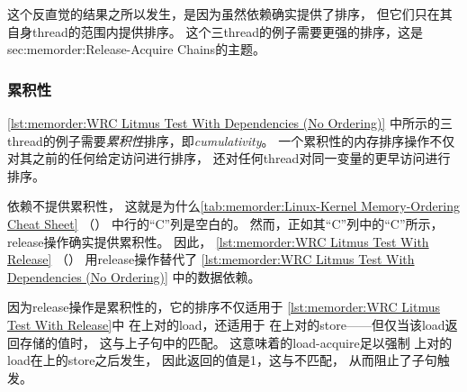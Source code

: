 \QuickQuizEnd

这个反直觉的结果之所以发生，是因为虽然依赖确实提供了排序，
但它们只在其自身thread的范围内提供排序。
这个三thread的例子需要更强的排序，这是
{sec:memorder:Release-Acquire Chains}的主题。

\subsubsection{累积性}
\label{sec:memorder:Cumulativity}

\cref{lst:memorder:WRC Litmus Test With Dependencies (No Ordering)}
中所示的三thread的例子需要\emph{累积性}排序，即\emph{cumulativity}。
一个累积性的内存排序操作不仅对其之前的任何给定访问进行排序，
还对任何thread对同一变量的更早访问进行排序。

\begin{listing}

\caption{带Release的WRC Litmus Test}
\label{lst:memorder:WRC Litmus Test With Release}
\end{listing}

依赖不提供累积性，
这就是为什么\cref{tab:memorder:Linux-Kernel Memory-Ordering Cheat Sheet}
（）
中行的``C''列是空白的。
然而，正如其``C''列中的``C''所示，
release操作确实提供累积性。
因此，
\cref{lst:memorder:WRC Litmus Test With Release}
（）
用release操作替代了
\cref{lst:memorder:WRC Litmus Test With Dependencies (No Ordering)}
中的数据依赖。
\begin{fcvref}
因为release操作是累积性的，它的排序不仅适用于
\cref{lst:memorder:WRC Litmus Test With Release}中
在上对的load，还适用于
在上对的store——但仅当该load返回存储的值时，
这与上子句中的匹配。
这意味着的load-acquire足以强制
上对的load在上的store之后发生，
因此返回的值是1，这与不匹配，
从而阻止了子句触发。
\end{fcvref}

